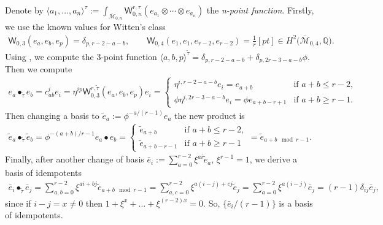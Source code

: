 \documentclass[pdftex]{sigma}
\def\oM{\overline{\mathcal{M}}}
\def\W{\mathsf{W}}
\numberwithin{equation}{section}
\begin{document}
\begin{Example}
Denote by $\langle a_1,\dots,a_n\rangle^{\tau}:= \int_{\oM_{0,n}}\W_{0,n}^{r,\tau}(e_{a_1} \otimes \cdots \otimes e_{a_n})$ the \emph{n-point function}.
Firstly, we use the known values for Witten's class
\begin{align*}
 \W_{0,3}(e_a,e_b,e_p)=\delta_{p,r-2-a-b}, \qquad \W_{0,4}(e_1,e_1,e_{r-2},e_{r-2})=\frac{1}{r}[pt]\in H^2\big(\oM_{0,4},\mathbb{Q}\big).
\end{align*}
Using \cite[Proposition 4.1]{PPZ16},
we compute the 3-point function
$\langle a,b,p\rangle^{\widetilde{\tau}}\! =\! \delta_{p,r-2-a-b}+\delta_{p,2r-3-a-b}\phi$.
Then we compute
\begin{align*}
e_{a} \bullet_{\widetilde{\tau}} e_{b} = c^{i}_{ab}e_i=\eta^{ip}\W_{0,3}^{r,\widetilde{\tau}}(e_a,e_b,e_p)e_i
=
\begin{cases}
\eta^{i, r-2-a-b} e_i = e_{a+b}& \text{if } a+b \leq r-2 ,\\
\phi \eta^{i, 2r-3-a-b}e_i= \phi e_{a+b-r+1} & \text{if } a+b \geq r-1.
\end{cases}
\end{align*}
Then changing a basis to $\widetilde{e}_a:=\phi ^{-a/(r-1)}e_a$ the new product is
\begin{align*}
\widetilde{e}_a \bullet_{\widetilde{\tau}} \widetilde{e}_b =
\phi^{-(a+b)/r-1} e_a \bullet e_b =
\begin{cases}
\widetilde{e}_{a+b} & \text{if } a+b\leq r-2,\\
\widetilde{e}_{a+b-r-1}& \text{if } a+b\geq r-1
\end{cases}
=
\widetilde{e}_{a+b \mod r-1}.
\end{align*}
Finally, after another change of basis $\bar{e}_i :=\sum^{r-2}_{a=0} \xi ^{a i} \widetilde{e}_a$, $\xi^{r-1} =1$, we derive a basis of idempo\-tents
\begin{align*}
\bar{e}_i \bullet_{\widetilde{\tau}} \bar{e}_j =
\sum_{a,b=0}^{r-2} \xi^{a i +b j}\widetilde{e}_{a+b \mod r-1}=
\sum_{a,c=0}^{r-2}\xi^{a(i-j)+c j}\widetilde{e}_j=
\sum^{r-2}_{a=0} \xi ^{a(i-j)}\bar{e}_{j} = (r-1)\delta_{ij}\bar{e}_{j},
\end{align*}
since if $i-j = x\neq 0$ then $1+\xi^{x}+\dots + \xi ^{(r-2)x} = 0$. So, $\{\bar{e}_{i}/(r-1)\}$ is a basis of idempotents.
\end{Example}
\end{document}
